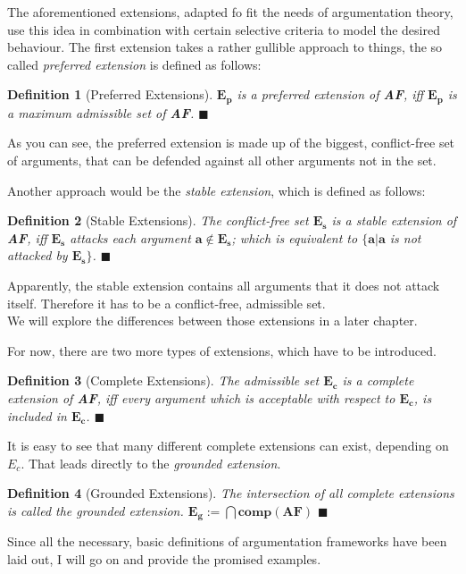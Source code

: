\documentclass[12pt]{report}
\numberwithin{figure}{chapter}
\theoremstyle{break}
\newtheorem{defn}{Definition}[chapter]
\newenvironment{mydefn}{\begin{defn}}{$\blacksquare$ \end{defn}}
\begin{document}
The aforementioned extensions, adapted fo fit the needs of argumentation theory, use this idea in combination with certain selective criteria to model the desired behaviour. 
The first extension takes a rather gullible approach to things, the so called \textit{preferred extension} is defined as follows:

\begin{mydefn}[Preferred Extensions]
$\bm{E_{p}}$ is a preferred extension of \textbf{AF}, iff $\bm{E_{p}}$ is a maximum admissible set of \textbf{AF}.
\end{mydefn}

As you can see, the preferred extension is made up of the biggest, conflict-free set of arguments, that can be defended against all other arguments not in the set.

Another approach would be the \textit{stable extension}, which is defined as follows:
\begin{mydefn}[Stable Extensions]
The conflict-free set $\bm{E_{s}}$ is a stable extension of \textbf{AF}, iff $\bm{E_{s}}$ attacks each argument $\bm{a \notin E_{s}}$; which is equivalent to
$\bm{\{a|a}$ is not attacked by $\bm{E_{s}\}}$.
\end{mydefn}

Apparently, the stable extension contains all arguments that it does not attack itself. Therefore it has to be a conflict-free, admissible set.\\
We will explore the differences between those extensions in a later chapter. 

For now, there are two more types of extensions, which have to be introduced.

\begin{mydefn}[Complete Extensions]
The admissible set $\bm{E_{c}}$ is a complete extension of \textbf{AF}, iff every argument which is acceptable with respect to $\bm{E_{c}}$, is included in $\bm{E_{c}}$.
\end{mydefn}

It is easy to see that many different complete extensions can exist, depending on $E_{c}$. That leads directly to the \textit{grounded extension}.

\begin{mydefn}[Grounded Extensions]
The intersection of all complete extensions is called the grounded extension. $\bm{E_{g} := \bigcap{comp(AF)}}$
\end{mydefn}

Since all the necessary, basic definitions of argumentation frameworks have been laid out, I will go on and provide the promised examples.
\end{document}
